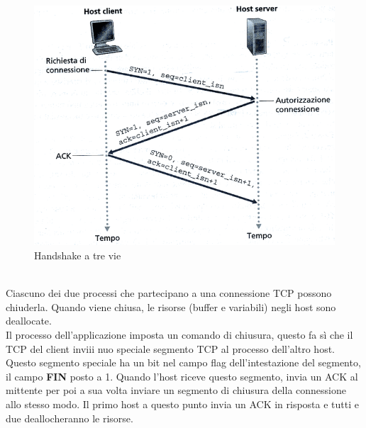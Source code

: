\documentclass[11pt,a4paper]{book}
\begin{document}
\begin{figure}
	\includegraphics[scale=0.6]{img/035.png}
	\caption{Handshake a tre vie}
\end{figure}
\\
Ciascuno dei due processi che partecipano a una connessione TCP possono chiuderla. Quando viene chiusa, le risorse (buffer e variabili) negli host sono deallocate. \\
Il processo dell'applicazione imposta un comando di chiusura, questo fa sì che il TCP del client inviii nuo speciale segmento TCP al processo dell'altro host. Questo segmento speciale ha un bit nel campo flag dell'intestazione del segmento, il campo \textbf{FIN} posto a 1. Quando l'host riceve questo segmento, invia un ACK al mittente per poi a sua volta inviare un segmento di chiusura della connessione allo stesso modo. Il primo host a questo punto invia un ACK in risposta e tutti e due deallocheranno le risorse. \\
\end{document}
